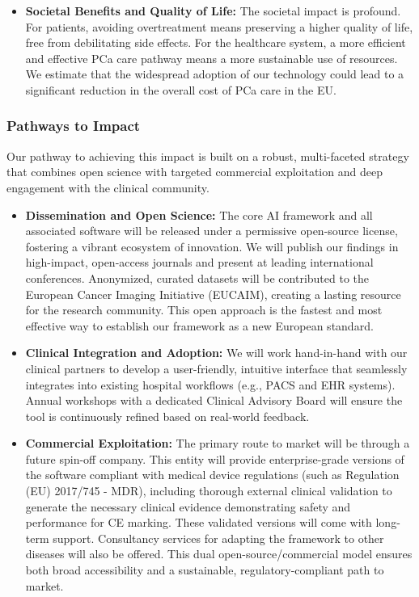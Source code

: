 \documentclass[11pt, a4paper]{article}
\begin{document}
\begin{itemize}
    \item \textbf{Societal Benefits and Quality of Life:} The societal impact is profound. For patients, avoiding overtreatment means preserving a higher quality of life, free from debilitating side effects. For the healthcare system, a more efficient and effective PCa care pathway means a more sustainable use of resources. We estimate that the widespread adoption of our technology could lead to a significant reduction in the overall cost of PCa care in the EU.
\end{itemize}

\subsubsection{Pathways to Impact}

Our pathway to achieving this impact is built on a robust, multi-faceted strategy that combines open science with targeted commercial exploitation and deep engagement with the clinical community.

\begin{itemize}
    \item \textbf{Dissemination and Open Science:} The core AI framework and all associated software will be released under a permissive open-source license, fostering a vibrant ecosystem of innovation. We will publish our findings in high-impact, open-access journals and present at leading international conferences. Anonymized, curated datasets will be contributed to the European Cancer Imaging Initiative (EUCAIM), creating a lasting resource for the research community. This open approach is the fastest and most effective way to establish our framework as a new European standard.

    \item \textbf{Clinical Integration and Adoption:} We will work hand-in-hand with our clinical partners to develop a user-friendly, intuitive interface that seamlessly integrates into existing hospital workflows (e.g., PACS and EHR systems). Annual workshops with a dedicated Clinical Advisory Board will ensure the tool is continuously refined based on real-world feedback.

  \item \textbf{Commercial Exploitation:} The primary route to market will be through a future spin-off company. This entity will provide enterprise-grade versions of the software compliant with medical device regulations (such as Regulation (EU) 2017/745 - MDR), including thorough external clinical validation to generate the necessary clinical evidence demonstrating safety and performance for CE marking. These validated versions will come with long-term support. Consultancy services for adapting the framework to other diseases will also be offered. This dual open-source/commercial model ensures both broad accessibility and a sustainable, regulatory-compliant path to market.
\end{itemize}
\end{document}
